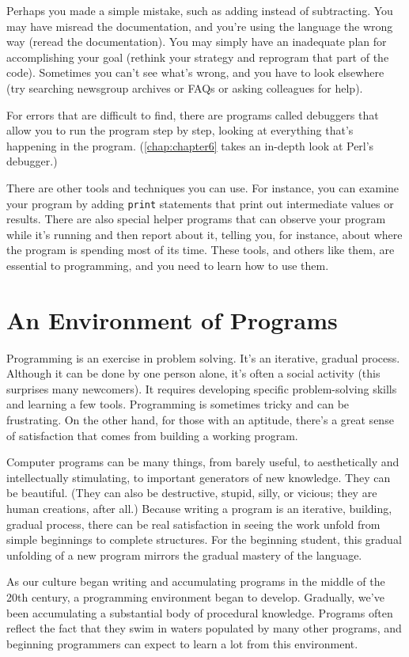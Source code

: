 Perhaps you made a simple mistake, such as adding instead of subtracting. You may have misread the documentation, and you're using the language the wrong way (reread the documentation). You may simply have an inadequate plan for accomplishing your goal (rethink your strategy and reprogram that part of the code). Sometimes you can't see what's wrong, and you have to look elsewhere (try searching newsgroup archives or FAQs or asking colleagues for help).

For errors that are difficult to find, there are programs called debuggers that allow you to run the program step by step, looking at everything that's happening in the program. (\autoref{chap:chapter6} takes an in-depth look at Perl's debugger.)

There are other tools and techniques you can use. For instance, you can examine your program by adding \verb|print| statements that print out intermediate values or results. There are also special helper programs that can observe your program while it's running and then report about it, telling you, for instance, about where the program is spending most of its time. These tools, and others like them, are essential to programming, and you need to learn how to use them. 

\section{An Environment of Programs}
Programming is an exercise in problem solving. It's an iterative, gradual process. Although it can be done by one person alone, it's often a social activity (this surprises many newcomers). It requires developing specific problem-solving skills and learning a few tools. Programming is sometimes tricky and can be frustrating. On the other hand, for those with an aptitude, there's a great sense of satisfaction that comes from building a working program.

Computer programs can be many things, from barely useful, to aesthetically and intellectually stimulating, to important generators of new knowledge. They can be beautiful. (They can also be destructive, stupid, silly, or vicious; they are human creations, after all.) Because writing a program is an iterative, building, gradual process, there can be real satisfaction in seeing the work unfold from simple beginnings to complete structures. For the beginning student, this gradual unfolding of a new program mirrors the gradual mastery of the language.

As our culture began writing and accumulating programs in the middle of the 20th century, a programming environment began to develop. Gradually, we've been accumulating a substantial body of procedural knowledge.  Programs often reflect the fact that they swim in waters populated by many other programs, and beginning programmers can expect to learn a lot from this environment.

